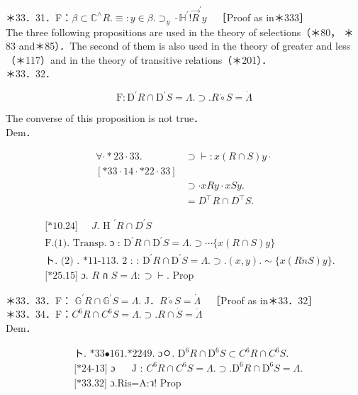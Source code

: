 \documentclass[10pt]{article}
\begin{document}
＊33．31．F：$\beta \subset \mathbb{C}^{\wedge} R . \equiv: y \in \beta . \supset_{y} \cdot \mathbb{H}^{\prime}!\vec{R}^{\prime} y \quad$［Proof as in＊333］\\
The three following propositions are used in the theory of selections（＊80， ＊83 and＊85）．The second of them is also used in the theory of greater and less（＊117）and in the theory of transitive relations（＊201）．\\
＊33．32．

$$
\mathrm{F}: \mathrm{D}^{\prime} R \cap \mathrm{D}^{\prime} S=\Lambda . \supset . R \dot{\circ} S=\dot{\Lambda}
$$

The converse of this proposition is not true．\\
Dem．

$$
\begin{aligned}
\forall \cdot * 23 \cdot 33 . & \supset \vdash: x(R \cap S) y \cdot \\
{[* 33 \cdot 14 \cdot * 22 \cdot 33] } & \\
& \supset \cdot x R y \cdot x S y . \\
& =D^{\top} R \cap D^{\top} S .
\end{aligned}
$$


\begin{align*}
& \text { [*10.24] } \quad J . \text { H }^{\prime} R \cap D^{\prime} S  \tag{1}\\
& \text { F.(1). Transp. ɔ : } \mathrm{D}^{\prime} R \cap \mathrm{D}^{\prime} S=\Lambda . \supset \cdots\{x(R \cap S) y\}  \tag{2}\\
& \text { ト. (2) . *11-113. } 2 \text { : : } \mathrm{D}^{\prime} R \cap \mathrm{D}^{\prime} S=\Lambda . \supset .(x, y) . \sim\{x(R \dot{n} S) y\} . \\
& \text { [*25.15] ɔ. } R \text { ก } S=\Lambda: \supset \vdash \text {. Prop }
\end{align*}


＊33．33．F： $\mathbb{G}^{\prime} R \cap \mathbb{G}^{\prime} S=\Lambda$. J．$R \dot{\circ} S=\dot{\Lambda} \quad$［Proof as in＊33．32］\\
＊33．34．F：$C^{6} R \cap C^{6} S=\Lambda . \supset . R \cap \dot{S}=\dot{\Lambda}$\\
Dem．

$$
\begin{aligned}
& \text { ト. *33•161.*2249. ɔㅇ. } \mathrm{D}^{6} R \cap \mathrm{D}^{6} S \subset C^{6} R \cap C^{6} S \text {. } \\
& \text { [*24-13] ɔ } \quad \text { J : } C^{6} R \cap C^{6} S=\Lambda . \supset . \mathrm{D}^{6} R \cap \mathrm{D}^{6} S=\Lambda \text {. } \\
& \text { [*33.32] ɔ.Ris=A:ว! Prop }
\end{aligned}
$$
\end{document}
